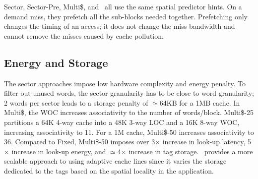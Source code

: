 {{Sector, Sector-Pre, Multi\$, and \AC\ all use the same spatial predictor hints. On a demand miss, they prefetch all the sub-blocks needed together. Prefetching only changes the timing of an access; it does not change the miss bandwidth and cannot remove the misses caused by cache pollution.

\subsection{Energy and Storage}
The sector approaches impose low hardware complexity and energy penalty. To filter out unused words, the sector granularity has to be close to word granularity; 2 words per sector leads to a storage penalty of $\simeq$64KB for a 1MB cache. In Multi\$, the WOC increases associativity to the number of words/block.  Multi\$-25 partitions a 64K 4-way cache into a 48K 3-way LOC and a 16K 8-way WOC, increasing associativity to 11. For a 1M cache, Multi\$-50 increases associativity to 36.  Compared to Fixed, Multi\$-50 imposes over 3$\times$ increase in look-up latency, 5$\times$ increase in look-up energy, and $\simeq$4$\times$ increase in tag storage. \AC\ provides a more scalable approach to using adaptive cache lines since it varies the storage dedicated to the tags based on the spatial locality in the application.

\begin{figure}[!ht]


\end{figure}}}
